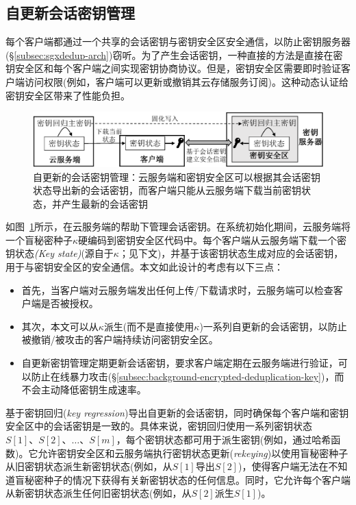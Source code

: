 \subsection{自更新会话密钥管理}
\label{subsec:sgxdedup-key-management}

每个客户端都通过一个共享的会话密钥与密钥安全区安全通信，以防止密钥服务器 (\S\ref{subsec:sgxdedup-arch})窃听。为了产生会话密钥，一种直接的方法是直接在密钥安全区和每个客户端之间实现密钥协商协议。但是，密钥安全区需要即时验证客户端访问权限(例如，客户端可以更新或撤销其云存储服务订阅)。这种动态认证给密钥安全区带来了性能负担。

\begin{figure}[!htb]
    \centering
    \includegraphics[width=\textwidth]{pic/sgxdedup/keyRegression.pdf}
    \caption{自更新的会话密钥管理：云服务端和密钥安全区可以根据其会话密钥状态导出新的会话密钥，而客户端只能从云服务端下载当前密钥状态，并产生最新的会话密钥}
    \label{fig:sgxdedup-keymanage}
\end{figure}

如图~\ref{fig:sgxdedup-keymanage}所示，\sysnameS 在云服务端的帮助下管理会话密钥。在系统初始化期间，云服务端将一个盲秘密种子$\kappa$硬编码到密钥安全区代码中。每个客户端从云服务端下载一个密钥状态\textit{(Key state)}(源自于$\kappa$；见下文)，并基于该密钥状态生成对应的会话密钥，用于与密钥安全区的安全通信。本文如此设计的考虑有以下三点：
\begin{itemize}
    \item 首先，当客户端对云服务端发出任何上传/下载请求时，云服务端可以检查客户端是否被授权。
    \item 其次，本文可以从$\kappa$派生(而不是直接使用$\kappa$)一系列自更新的会话密钥，以防止被撤销/被攻击的客户端持续访问密钥安全区。
    \item 自更新密钥管理定期更新会话密钥，要求客户端定期在云服务端进行验证，可以防止在线暴力攻击(\S\ref{subsec:background-encrypted-deduplication-key})，而不会主动降低密钥生成速率\cite{bellare2013DupLESS}。
\end{itemize}

\sysnameS 基于密钥回归(\textit{key regression})\cite{fu06}导出自更新的会话密钥，同时确保每个客户端和密钥安全区中的会话密钥是一致的。具体来说，密钥回归使用一系列密钥状态$S[1]、S[2]、\ldots、S[m]$，每个密钥状态都可用于派生密钥(例如，通过哈希函数)。它允许密钥安全区和云服务端执行密钥状态更新(\textit{rekeying})以使用盲秘密种子从旧密钥状态派生新密钥状态(例如，从$S[1]$导出$S[2]$)，使得客户端无法在不知道盲秘密种子的情况下获得有关新密钥状态的任何信息。同时，它允许每个客户端从新密钥状态派生任何旧密钥状态(例如，从$S[2]$派生$S[1]$)。

